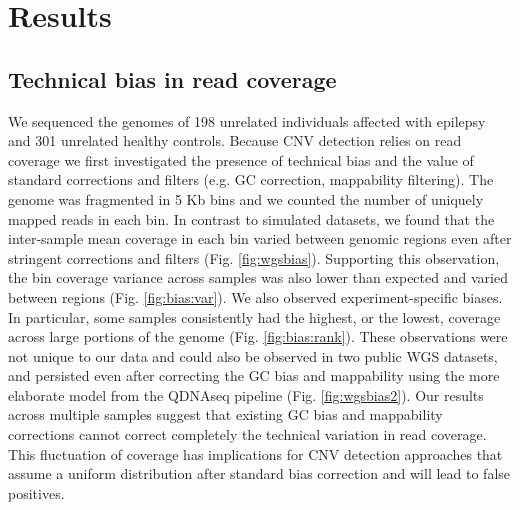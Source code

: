\section{Results}

\subsection*{Technical bias in read coverage}
We sequenced the genomes of 198 unrelated individuals affected with epilepsy and 301 unrelated healthy controls.
Because CNV detection relies on read coverage we first investigated the presence of technical bias and the value of standard corrections and filters (e.g. GC correction, mappability filtering).
The genome was fragmented in 5 Kb bins and we counted the number of uniquely mapped reads in each bin.
In contrast to simulated datasets, we found that the inter-sample mean coverage in each bin varied between genomic regions even after stringent corrections and filters (Fig. \ref{fig:wgsbias}).
Supporting this observation, the bin coverage variance across samples was also lower than expected and varied between regions (Fig. \ref{fig:bias:var}).
We also observed experiment-specific biases. In particular, some samples consistently had the highest, or the lowest, coverage across large portions of the genome (Fig. \ref{fig:bias:rank}).
These observations were not unique to our data and could also be observed in two public WGS datasets, and persisted even after correcting the GC bias and mappability using the more elaborate model from the {\sf QDNAseq} pipeline\cite{Scheinin2014} (Fig. \ref{fig:wgsbias2}).
Our results across multiple samples suggest that existing GC bias and mappability corrections\cite{Scheinin2014} cannot correct completely the technical variation in read coverage.
This fluctuation of coverage has implications for CNV detection approaches that assume a uniform distribution\cite{Boeva2011,Abyzov2011,Xi2011} after standard bias correction and will lead to false positives.

